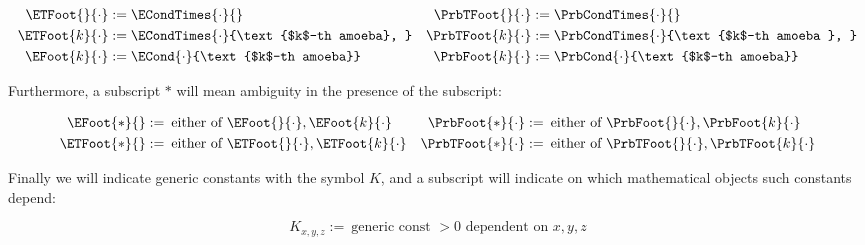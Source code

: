 \begin{align*}
	\ETFoot{}{\cdot}&:=\ECondTimes{\cdot}{}			& 			\PrbTFoot{}{\cdot}&:= \PrbCondTimes{\cdot}{}
	\\
	\ETFoot{k}{\cdot}&:=\ECondTimes{\cdot}{\text{$k$-th amoeba},	}			&				\PrbTFoot{k}{\cdot}&:= \PrbCondTimes{\cdot}{\text{$k$-th amoeba }, }
	\\
	\EFoot{k}{\cdot}&:=\ECond{\cdot}{\text{$k$-th amoeba}}				&				\PrbFoot{k}{\cdot}&:=\PrbCond{\cdot}{\text{$k$-th amoeba}}
\end{align*}

Furthermore, a subscript $\ast$ will mean ambiguity in the presence of the subscript:

\begin{align*}
	\EFoot{\ast}{} &:=  \: \text{either of }	\EFoot{}{\cdot}, \EFoot{k}{\cdot}				&		\PrbFoot{\ast}{\cdot}&:= \: \text{either of }	\PrbFoot{}{\cdot}, \PrbFoot{k}{\cdot}		
	\\
	\ETFoot{\ast}{} &:=  \: \text{either of }	\ETFoot{}{\cdot}, \ETFoot{k}{\cdot}			&		\PrbTFoot{\ast}{\cdot}&:= \: \text{either of }	\PrbTFoot{}{\cdot}, \PrbTFoot{k}{\cdot}		
\end{align*}

Finally we will indicate generic constants with the symbol $K$, and a subscript will indicate on which mathematical objects such constants depend:

\begin{equation*}
	K_{x,y,z}:= \: \text{generic const $>0$ dependent on $x,y,z$}
\end{equation*}

